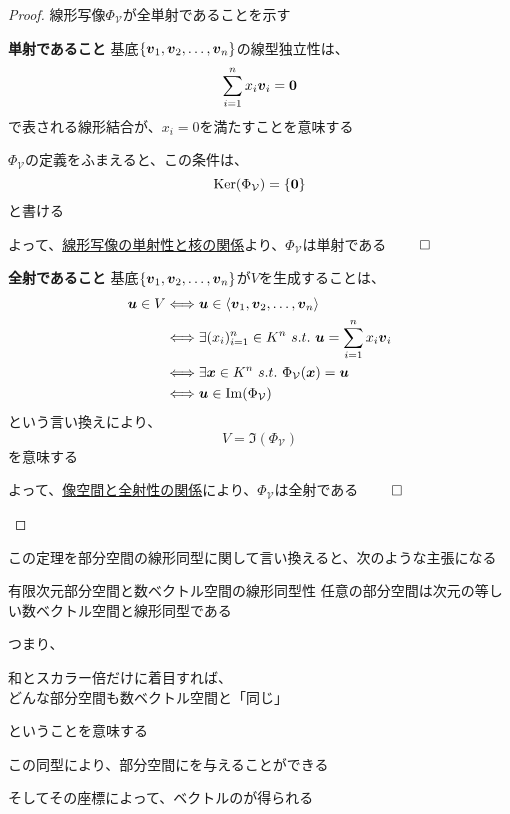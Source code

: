 \documentclass[../../../topic_linear-algebra]{subfiles}
\begin{document}
\begin{proof}
  線形写像$\Phi_{\mathcal{V}}$が全単射であることを示す

  \begin{subpattern}{\bfseries 単射であること}
    基底$\{ \vb*{v}_1, \vb*{v}_2, \dots, \vb*{v}_n \}$の線型独立性は、
    \begin{equation*}
      \sum_{i=1}^n x_i \vb*{v}_i = \vb*{0}
    \end{equation*}
    で表される線形結合が、$x_i = 0$を満たすことを意味する

    $\Phi_{\mathcal{V}}$の定義をふまえると、この条件は、
    \begin{equation*}
      \operatorname{Ker}(\Phi_{\mathcal{V}}) = \{ \vb*{0} \}
    \end{equation*}
    と書ける

    よって、\hyperref[thm:injective-iff-trivial-kernel]{線形写像の単射性と核の関係}より、$\Phi_{\mathcal{V}}$は単射である $\qed$
  \end{subpattern}

  \begin{subpattern}{\bfseries 全射であること}
    基底$\{ \vb*{v}_1, \vb*{v}_2, \dots, \vb*{v}_n \}$が$V$を生成することは、
    \begin{align*}
      \vb*{u} \in V & \Longleftrightarrow \vb*{u} \in \langle \vb*{v}_1, \vb*{v}_2, \dots, \vb*{v}_n \rangle           \\
                    & \Longleftrightarrow \exists (x_i)_{i=1}^n \in K^n \,\, s.t. \,\, \vb*{u} = \sum_{i=1}^n x_i \vb*{v}_i \\
                    & \Longleftrightarrow \exists \vb*{x} \in K^n \,\, s.t. \,\, \Phi_{\mathcal{V}}(\vb*{x}) = \vb*{u}      \\
                    & \Longleftrightarrow \vb*{u} \in \Im(\Phi_{\mathcal{V}})
    \end{align*}
    という言い換えにより、
    \begin{equation*}
      V = \Im(\Phi_{\mathcal{V}})
    \end{equation*}
    を意味する

    よって、\hyperref[sec:image-and-surjectivity]{像空間と全射性の関係}により、$\Phi_{\mathcal{V}}$は全射である $\qed$
  \end{subpattern}
\end{proof}

この定理を部分空間の線形同型に関して言い換えると、次のような主張になる

\begin{theorem}{有限次元部分空間と数ベクトル空間の線形同型性}
  任意の部分空間は次元の等しい数ベクトル空間と線形同型である
\end{theorem}

つまり、
\begin{shaded}
  和とスカラー倍だけに着目すれば、\\
  どんな部分空間も数ベクトル空間と「同じ」
\end{shaded}
ということを意味する

\br

この同型により、部分空間にを与えることができる

そしてその座標によって、ベクトルのが得られる
\end{document}
